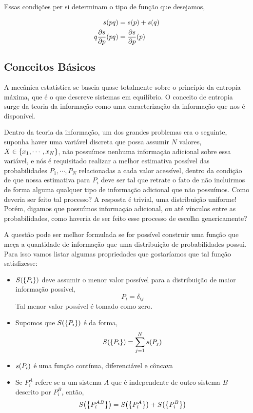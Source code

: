\documentclass[twoside]{amsart}
\numberwithin{equation}{section}
\begin{document}
Essas condições per si determinam o tipo de função que desejamos,

\begin{align}
    s\qty(pq)&=s\qty(p)+s\qty(q)\nonumber\\
    q\pdv{s}{p}\qty(pq)&=\pdv{s}{p}\qty(p)
\end{align}

\subsection{Conceitos Básicos}

A mecânica estatística se baseia quase totalmente sobre o princípio da entropia máxima, que é o que descreve sistemas em equilíbrio. O conceito de entropia surge da teoria da informação como uma caracterização da informação que nos é disponível. 

Dentro da teoria da informação, um dos grandes problemas era o seguinte, suponha haver uma variável discreta que possa assumir $N$ valores, $X\in\qty{x_1,\cdots, x_N}$, não possuímos nenhuma informação adicional sobre essa variável, e nós é requisitado realizar a melhor estimativa possível das probabilidades $P_1,\cdots, P_N$ relacionadas a cada valor acessível, dentro da condição de que nossa estimativa para $P_i$ deve ser tal que retrate o fato de não incluirmos de forma alguma qualquer tipo de informação adicional que não possuímos. Como deveria ser feito tal processo? A resposta é trivial, uma distribuição uniforme! Porém, digamos que possuímos informação adicional, ou até vínculos entre as probabilidades, como haveria de ser feito esse processo de escolha genericamente?

A questão pode ser melhor formulada se for possível construir uma função que meça a quantidade de informação que uma distribuição de probabilidades possui. Para isso vamos listar algumas propriedades que gostaríamos que tal função satisfizesse:

\begin{itemize}
    \item $S\qty(\qty{P_i})$ deve assumir o menor valor possível para a distribuição de maior informação possível, $$P_i=\delta_{ij}$$ Tal menor valor possível é tomado como zero.
    \item Supomos que $S\qty(\qty{P_i})$ é da forma, $$S\qty(\qty{P_i})=\sum\limits_{j=1}^{N}s\qty(P_j)$$
    \item $s\qty(P_i)$ é uma função contínua, diferenciável e côncava
    \item Se $P^A_i$ refere-se a um sistema $A$ que é independente de outro sistema $B$ descrito por $P^B_i$, então,
    $$S\qty(\qty{P^{AB}_i})=S\qty(\qty{P^A_i})+S\qty(\qty{P^B_i})$$
\end{itemize}
\end{document}
